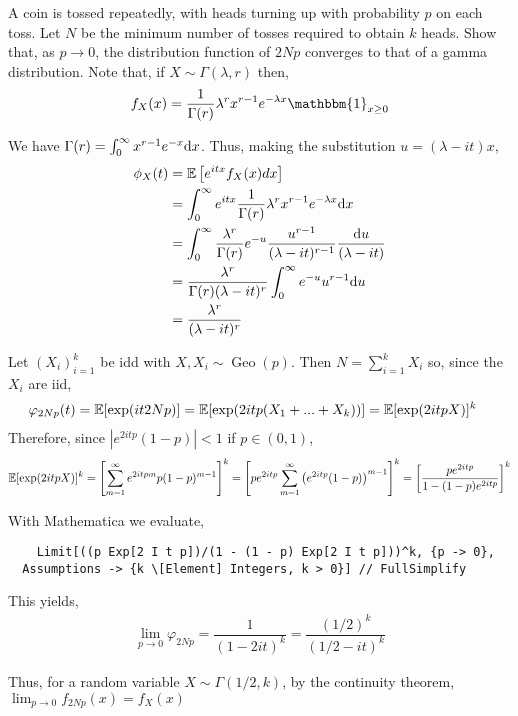 \documentclass[10pt]{article}
\begin{document}
\begin{problem}[Exercise 3.7]
A coin is tossed repeatedly, with heads turning up with probability \( p \) on each toss. Let \( N \) be the minimum number of tosses required to obtain \( k \) heads. Show that, as \( p\to 0 \), the distribution function of \( 2Np \) converges to that of a gamma distribution. Note that, if \(X \sim\Gamma(\lambda,r) \) then,
    \begin{align*}
        f_X(x) = \dfrac{1}{\Gamma(r)}\lambda^rx^{r-1}e^{-\lambda x}\mathbbm{1}_{x\geq 0}
    \end{align*}
\end{problem}

\begin{solution}[Solution]
We have \( \Gamma(r) = \int_{0}^{\infty} x^{r-1}e^{-x}\mathrm{d} x \). Thus, making the substitution \( u=(\lambda-it)x \),
\begin{align*}
    \phi_X(t) &= \mathbb{E}\left[ e^{itx}f_X(x)dx \right] \\ 
    &= \int_{0}^{\infty} e^{itx} \dfrac{1}{\Gamma(r)}\lambda^r x^{r-1}e^{-\lambda x} \mathrm{d} x \\
    &= \int_{0}^{\infty} \dfrac{\lambda^r}{\Gamma(r)}e^{-u} \dfrac{u^{r-1}}{(\lambda-it)^{r-1}} \dfrac{\mathrm{d} u}{(\lambda-it)} \\
    &= \dfrac{\lambda^r}{\Gamma(r)(\lambda-it)^r}\int_{0}^{\infty} e^{-u}u^{r-1} \mathrm{d} u \\
    &= \dfrac{\lambda^r}{(\lambda-it)^r}
\end{align*}


Let \( (X_i)_{i=1}^{k} \) be idd  with \( X,X_i\sim \operatorname{Geo}(p) \).
Then \( N=\sum_{i=1}^{k} X_i \) so, since the \( X_i \) are iid,
\begin{align*}
    \varphi_{2Np}(t) &= \mathbb{E}[\exp(it2Np)] 
    =\mathbb{E}[\exp(2itp(X_1+...+X_k))] 
    =\mathbb{E}[\exp(2itpX)]^k 
\end{align*}
Therefore, since \( |e^{2itp}(1-p)|<1 \) if \( p\in(0,1) \),
\begin{align*}
    \mathbb{E}[\exp(2itpX)]^k 
    = \left[ \sum_{m=1}^{\infty} e^{2itpm}p(1-p)^{m-1} \right]^k 
    = \left[ pe^{2itp}\sum_{m=1}^{\infty}\left(e^{2itp}(1-p)\right)^{m-1} \right]^k 
    = \left[ \dfrac{pe^{2itp}}{1-(1-p)e^{2itp}} \right]^k
\end{align*}

With Mathematica we evaluate,
\begin{lstlisting}
    Limit[((p Exp[2 I t p])/(1 - (1 - p) Exp[2 I t p]))^k, {p -> 0}, 
  Assumptions -> {k \[Element] Integers, k > 0}] // FullSimplify
\end{lstlisting}

This yields,
\begin{align*}
    \lim_{p\to 0} \varphi_{2Np} = \dfrac{1}{(1-2it)^k} = \dfrac{(1/2)^k}{(1/2-it)^k}
\end{align*}

Thus, for a random variable \( X\sim\Gamma(1/2,k) \), by the continuity theorem, 
\( \lim_{p\to 0} f_{2Np}(x) = f_X(x) \)

\end{solution}
\end{document}
